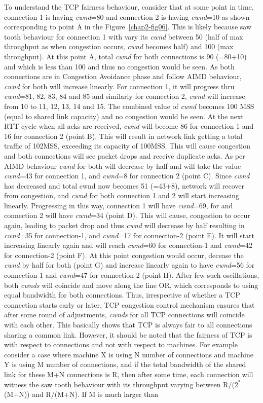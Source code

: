 \begin{multicols}{2}
To understand the TCP fairness behaviour, consider that at some point in time, connection 1 is having \textit{cwnd}=80 and connection 2 is having \textit{cwnd}=10 as shown corresponding to point A in the Figure~\ref{chap2-fig06}. This is likely because saw tooth behaviour for connection 1 with vary its \textit{cwnd} between 50 (half of max throughput as when congestion occurs, \textit{cwnd} becomes half) and 100 (max throughput). At this point A, total \textit{cwnd} for both connections is 90 (=80+10) and which is less than 100 and thus no congestion would be seen. As both connections are in Congestion Avoidance phase and follow AIMD behaviour, \textit{cwnd} for both will increase linearly. For connection 1, it will progress thru \textit{cwnd}=81, 82, 83, 84 and 85 and similarly for connection 2, \textit{cwnd} will increase from 10 to 11, 12, 13, 14 and 15. The combined value of \textit{cwnd} becomes 100 MSS (equal to shared link capacity) and no congestion would be seen. At the next RTT cycle when all acks are received, \textit{cwnd} will become 86 for connection 1 and 16 for connection 2 (point B). This will result in network link getting a total traffic of 102MSS, exceeding its capacity of 100MSS. This will cause congestion and both connections will see packet drops and receive duplicate acks. As per AIMD behaviour \textit{cwnd} for both will decrease by half and will take the value \textit{cwnd}=43 for connection 1, and \textit{cwnd}=8 for connection 2 (point C). Since \textit{cwnd} has decreased and total cwnd now becomes 51 (=43+8), network will recover from congestion, and \textit{cwnd} for both connection 1 and 2 will start increasing linearly. Progressing in this way, connection 1 will have \textit{cwnd}=69, for and connection 2 will have \textit{cwnd}=34 (point D). This will cause, congestion to occur again, leading to packet drop and thus \textit{cwnd} will decrease by half resulting in \textit{cwnd}=35 for connection-1, and \textit{cwnd}=17 for connection-2 (point E). It will start increasing linearly again and will reach \textit{cwnd}=60 for connection-1 and \textit{cwnd}=42 for connection-2 (point F). At this point congestion would occur, decease the \textit{cwnd} by half for both (point G) and increase linearly again to have \textit{cwnd}=56 for connection-1 and \textit{cwnd}=47 for connection-2 (point H). After few such oscillations, both \textit{cwnds} will coincide and move along the line OR, which corresponds to using equal bandwidth for both connections. Thus, irrespective of whether a TCP connection starts early or later, TCP congestion control mechanism ensures that after some round of adjustments, \textit{cwnds} for all TCP connections will coincide with each other. This basically shows that TCP is always fair to all connections sharing a common link. However, it should be noted that the fairness of TCP is with respect to connections and not with respect to machines. For example consider a case where machine X is using N number of connections and machine Y is using M number of connections, and if the total bandwidth of the shared link for these M+N connections is R, then after some time, each connection will witness the saw tooth behaviour with its throughput varying between R/($2^{\ast}$(M+N)) and R/(M+N). If M is much larger than 
\end{multicols}
